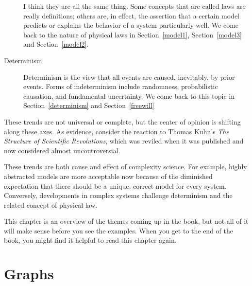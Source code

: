 \documentclass[12pt]{book}
\theoremstyle{exercise}
\newcommand{\myrightarrow}{\ensuremath \rightarrow}
\begin{document}
\begin{description}

  I think they are all the same thing.  Some concepts that are called
  laws are really definitions; others are, in effect, the
  assertion that a certain model predicts or explains the behavior of a system
  particularly well.  We come back to the nature of physical laws in
  Section~\ref{model1}, Section~\ref{model3} and Section~\ref{model2}.


\item[Determinism \myrightarrow~indeterminism] Determinism is the view
  that all events are caused, inevitably, by prior events.  Forms of
  indeterminism include randomness, probabilistic causation, and
  fundamental uncertainty.  We come back to this
  topic in Section~\ref{determinism} and Section~\ref{freewill}


\end{description}

These trends are not universal or complete, but the center of
opinion is shifting along these axes.  As evidence, consider the
reaction to Thomas Kuhn's {\em The Structure of Scientific
  Revolutions}, which was reviled when it was published and
now considered almost uncontroversial.


These trends are both cause and effect of complexity science.  For
example, highly abstracted models are more acceptable now because of
the diminished expectation that there should be a unique, correct model
for every system.  Conversely, developments in complex systems
challenge determinism and the related concept of physical law.

This chapter is an overview of the themes coming up in the book, but
not all of it will make sense before you see the examples.  When you
get to the end of the book, you might find it helpful to read this
chapter again.


\chapter{Graphs}
\label{graphs}

\newcommand{\Erdos}{Erd\H{o}s}
\newcommand{\Renyi}{R\'{e}nyi}
\end{document}
